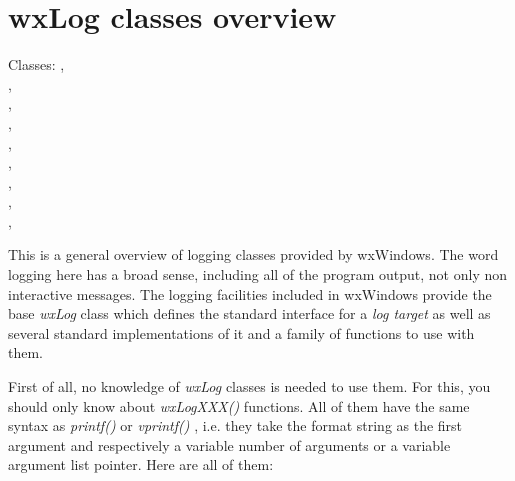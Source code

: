 \section{wxLog classes overview}\label{wxlogoverview}

Classes: ,\\
,\\
,\\
,\\
,\\
,\\
,\\
,\\
,\\

This is a general overview of logging classes provided by wxWindows. The word
logging here has a broad sense, including all of the program output, not only
non interactive messages. The logging facilities included in wxWindows provide
the base {\it wxLog} class which defines the standard interface for a {\it log
target} as well as several standard implementations of it and a family of
functions to use with them.

First of all, no knowledge of {\it wxLog} classes is needed to use them. For
this, you should only know about {\it wxLogXXX()} functions. All of them have
the same syntax as {\it printf()} or {\it vprintf()} , i.e. they take the
format string as the first argument and respectively a variable number of
arguments or a variable argument list pointer. Here are all of them:


